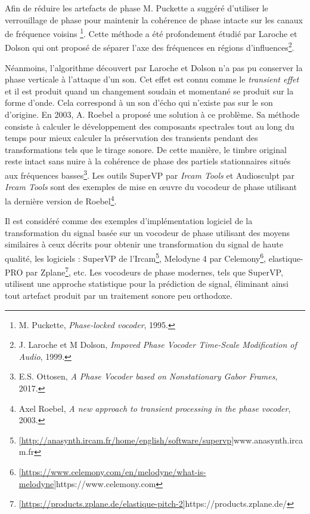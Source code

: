 Afin de réduire les artefacts de phase M. Puckette a suggéré d'utiliser le verrouillage de phase pour maintenir la cohérence de phase intacte sur les canaux de fréquence voisins \footnote{M. Puckette, \textit{Phase-locked vocoder}, 1995. \nocite{puckette1995phase}}. Cette méthode a été profondement étudié par Laroche et Dolson qui ont proposé de séparer l’axe des fréquences en régions d’influences\footnote{J. Laroche et M Dolson, \textit{Impoved Phase Vocoder Time-Scale Modification of Audio}, 1999. \nocite{DoLa99}}.

Néanmoins, l'algorithme découvert par Laroche et Dolson n'a pas pu conserver la phase verticale à l’attaque d’un son. Cet effet est connu comme le \textit{transient effet} et il est produit quand un changement soudain et momentané se produit sur la forme d'onde. Cela  correspond à un son d’écho qui n'existe pas sur le son d'origine. En 2003, A. Roebel a proposé une solution à ce problème. Sa méthode consiste à calculer le développement des composants spectrales tout au long du temps pour mieux calculer la préservation des transients pendant des transformations tels que le tirage sonore. De cette manière, le timbre original reste intact sans nuire à la cohérence de phase des partiels stationnaires situés aux fréquences basses\footnote{E.S. Ottosen, \textit{A Phase Vocoder based on Nonstationary Gabor Frames}, 2017. \nocite{ottosen2017phase}}. Les outils SuperVP par \textit{Ircam Tools} et Audiosculpt par \textit{Ircam Tools} sont des exemples de mise en œuvre du vocodeur de phase utilisant la dernière version de Roebel\footnote{Axel Roebel, \textit{A new approach to transient processing in the phase vocoder}, 2003. \nocite{roebel:hal-01161124}}.

Il est considéré comme des exemples d'implémentation logiciel de la transformation du signal basée sur un vocodeur de phase utilisant des moyens similaires à ceux décrits pour obtenir une transformation du signal de haute qualité, les logiciels : SuperVP de l'Ircam\footnote{ \ref{http://anasynth.ircam.fr/home/english/software/supervp}{www.anasynth.ircam.fr}}, Melodyne 4 par Celemony\footnote{ \ref{https://www.celemony.com/en/melodyne/what-is-melodyne}{https://www.celemony.com}}, elastique-PRO par Zplane\footnote{ \ref{https://products.zplane.de/elastique-pitch-2}{https://products.zplane.de/}}, etc. Les vocodeurs de phase modernes, tels que SuperVP, utilisent une approche statistique pour la prédiction de signal, éliminant ainsi tout artefact produit par un traitement sonore peu orthodoxe.

